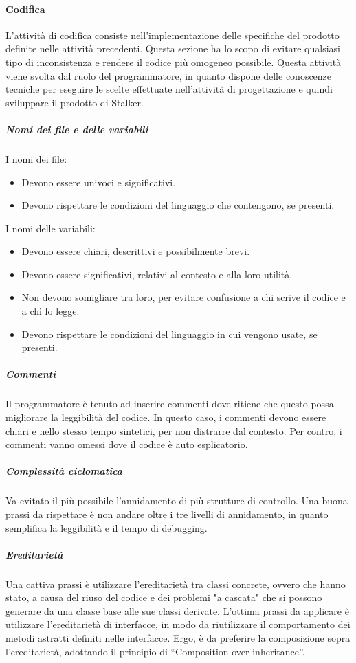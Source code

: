 \documentclass[../../norme-di-progetto.tex]{subfiles}
\begin{document}
\paragraph{Codifica}%
\label{par:codifica}
L'attività di codifica consiste nell'implementazione delle specifiche del prodotto definite nelle attività precedenti.
Questa sezione ha lo scopo di evitare qualsiasi tipo di inconsistenza e rendere il codice più omogeneo possibile.
Questa attività viene svolta dal ruolo del programmatore, in quanto dispone delle conoscenze tecniche per eseguire le scelte effettuate nell'attività di progettazione e quindi sviluppare il prodotto di Stalker.

\subparagraph{Nomi dei file e delle variabili}%
\label{subp:nomi_file_e_variabili}
I nomi dei file:
\begin{itemize}
    \item Devono essere univoci e significativi.
    \item Devono rispettare le condizioni del linguaggio che contengono, se presenti.
\end{itemize}
I nomi delle variabili:
\begin{itemize}
    \item Devono essere chiari, descrittivi e possibilmente brevi.
    \item Devono essere significativi, relativi al contesto e alla loro utilità.
    \item Non devono somigliare tra loro, per evitare confusione a chi scrive il codice e a chi lo legge.
    \item Devono rispettare le condizioni del linguaggio in cui vengono usate, se presenti.
\end{itemize}

\subparagraph{Commenti}%
\label{subp:commenti}
Il programmatore è tenuto ad inserire commenti dove ritiene che questo possa migliorare la leggibilità del codice.
In questo caso, i commenti devono essere chiari e nello stesso tempo sintetici, per non distrarre dal contesto.
Per contro, i commenti vanno omessi dove il codice è auto esplicatorio.

\subparagraph{Complessità ciclomatica}%
\label{subp:complessita_ciclomatica}
Va evitato il più possibile l’annidamento di più strutture di controllo.
Una buona prassi da rispettare è non andare oltre i tre livelli di annidamento, in quanto semplifica la leggibilità e il tempo di debugging.

\subparagraph{Ereditarietà}%
\label{subp:ereditarieta}
Una cattiva prassi è utilizzare l’ereditarietà tra classi concrete, ovvero che hanno stato, a causa del riuso del codice e dei problemi "a cascata" che si possono generare da una classe base alle sue classi derivate.
L'ottima prassi da applicare è utilizzare l'ereditarietà di interfacce, in modo da riutilizzare il comportamento dei metodi astratti definiti nelle interfacce.
Ergo, è da preferire la composizione sopra l'ereditarietà, adottando il principio di “Composition over inheritance”.
\end{document}
